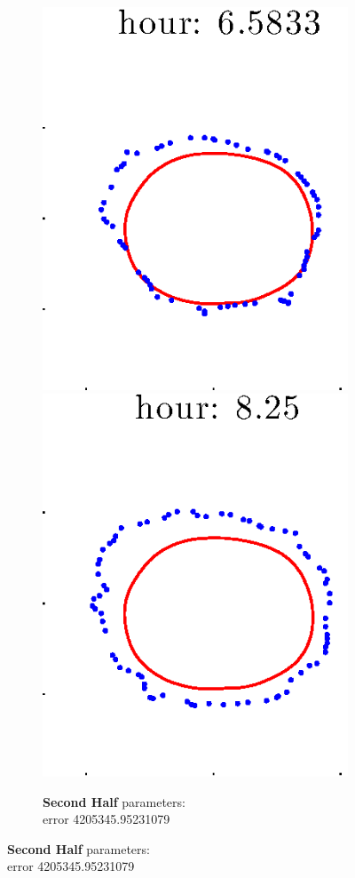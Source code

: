 \documentclass[12pt]{article}
\begin{document}
\begin{figure}[h!]
\begin{subfigure}[b]{.3\textwidth}
		\includegraphics[height=.15\textheight]{Pos10exp2/full/second5.eps}
		\includegraphics[height=.15\textheight]{Pos10exp2/full/second6.eps}
		\caption{\textbf{Second Half} parameters: \\error 4205345.95231079}
	\end{subfigure}
\end{figure}
\end{document}
